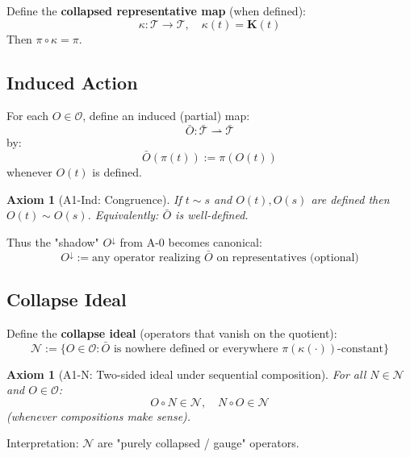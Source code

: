 \documentclass[12pt, oneside]{article}
\newtheorem{axiom}[theorem]{Axiom}
\newcommand{\K}{\mathbf{K}}
\newcommand{\N}{\mathcal{N}}
\newcommand{\T}{\mathcal{T}}
\newcommand{\Opr}{\mathcal{O}}
\begin{document}
Define the \textbf{collapsed representative map} (when defined):
\begin{equation}
\kappa: \T \rightarrow \T,\quad \kappa(t) = \K(t)
\end{equation}
Then $\pi \circ \kappa = \pi$.

\subsection{Induced Action}

For each $O \in \Opr$, define an induced (partial) map:
\begin{equation}
\bar{O}: \bar{\T} \rightharpoonup \bar{\T}
\end{equation}
by:
\begin{equation}
\bar{O}(\pi(t)) := \pi(O(t))
\end{equation}
whenever $O(t)$ is defined.

\begin{axiom}[A1-Ind: Congruence]
If $t \sim s$ and $O(t), O(s)$ are defined then $O(t) \sim O(s)$. Equivalently: $\bar{O}$ is well-defined.
\end{axiom}

Thus the "shadow" $O^{\downarrow}$ from A-0 becomes canonical:
\begin{equation}
O^{\downarrow} := \text{any operator realizing } \bar{O} \text{ on representatives (optional)}
\end{equation}

\subsection{Collapse Ideal}

Define the \textbf{collapse ideal} (operators that vanish on the quotient):
\begin{equation}
\N := \{ O \in \Opr : \bar{O} \text{ is nowhere defined or everywhere } \pi(\kappa(\cdot))\text{-constant} \}
\end{equation}

\begin{axiom}[A1-N: Two-sided ideal under sequential composition]
For all $N \in \N$ and $O \in \Opr$:
\begin{equation}
O \circ N \in \N,\quad N \circ O \in \N
\end{equation}
(whenever compositions make sense).
\end{axiom}

Interpretation: $\N$ are "purely collapsed / gauge" operators.
\end{document}
